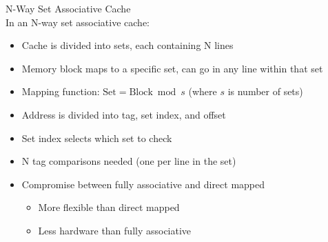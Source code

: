 \begin{concept}{N-Way Set Associative Cache}\\
In an N-way set associative cache:
\begin{itemize}
    \item Cache is divided into sets, each containing N lines
    \item Memory block maps to a specific set, can go in any line within that set
    \item Mapping function: $\text{Set} = \text{Block} \bmod s$ (where $s$ is number of sets)
    \item Address is divided into tag, set index, and offset
    \item Set index selects which set to check
    \item N tag comparisons needed (one per line in the set)
    \item Compromise between fully associative and direct mapped
    \begin{itemize}
        \item More flexible than direct mapped
        \item Less hardware than fully associative
    \end{itemize}
\end{itemize}
\end{concept}


